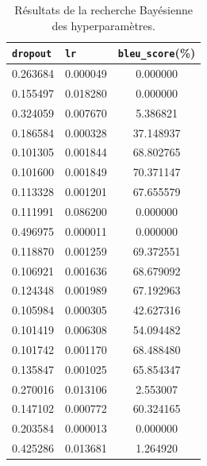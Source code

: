 \begin{table}[htb]
    \begin{center}
        \begin{tabular}{llc}
            \toprule
            \verb|dropout| & \verb|lr| & \verb|bleu_score|(\%) \\
            \midrule
            0.263684       & 0.000049 &        0.000000        \\
            0.155497       & 0.018280 &        0.000000        \\
            0.324059       & 0.007670 &        5.386821        \\
            0.186584       & 0.000328 &       37.148937        \\
            0.101305       & 0.001844 &       68.802765        \\
            0.101600       & 0.001849 &       70.371147        \\
            0.113328       & 0.001201 &       67.655579        \\
            0.111991       & 0.086200 &        0.000000        \\
            0.496975       & 0.000011 &        0.000000        \\
            0.118870       & 0.001259 &       69.372551        \\
            0.106921       & 0.001636 &       68.679092        \\
            0.124348       & 0.001989 &       67.192963        \\
            0.105984       & 0.000305 &       42.627316        \\
            0.101419       & 0.006308 &       54.094482        \\
            0.101742       & 0.001170 &       68.488480        \\
            0.135847       & 0.001025 &       65.854347        \\
            0.270016       & 0.013106 &        2.553007        \\
            0.147102       & 0.000772 &       60.324165        \\
            0.203584       & 0.000013 &        0.000000        \\
            0.425286       & 0.013681 &        1.264920        \\
            \bottomrule
        \end{tabular}
    
    \end{center}
    \caption{Résultats de la recherche Bayésienne des hyperparamètres.}%
    \label{tab.results.hparams}
\end{table}

